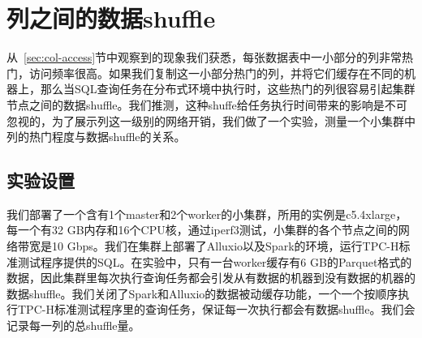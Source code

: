 \section{列之间的数据shuffle}
\label{sec:data-shuffle}

\par 从~\ref{sec:col-access}节中观察到的现象我们获悉，每张数据表中一小部分的列非常热门，访问频率很高。如果我们复制这一小部分热门的列，并将它们缓存在不同的机器上，那么当SQL查询任务在分布式环境中执行时，这些热门的列很容易引起集群节点之间的数据shuffle。我们推测，这种shuffe给任务执行时间带来的影响是不可忽视的，为了展示列这一级别的网络开销，我们做了一个实验，测量一个小集群中列的热门程度与数据shuffle的关系。

\subsection{实验设置}
\label{subsec:data-shuffle-setup}

\par 我们部署了一个含有1个master和2个worker的小集群，所用的实例是c5.4xlarge，每一个有32 GB内存和16个CPU核，通过iperf3测试，小集群的各个节点之间的网络带宽是10 Gbps。我们在集群上部署了Alluxio以及Spark的环境，运行TPC-H标准测试程序提供的SQL。在实验中，只有一台worker缓存有6 GB的Parquet格式的数据，因此集群里每次执行查询任务都会引发从有数据的机器到没有数据的机器的数据shuffle。我们关闭了Spark和Alluxio的数据被动缓存功能，一个一个按顺序执行TPC-H标准测试程序里的查询任务，保证每一次执行都会有数据shuffle。我们会记录每一列的总shuffle量。

